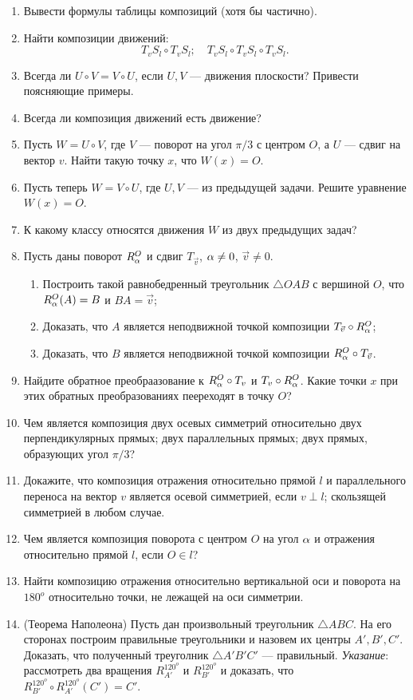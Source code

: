 \begin{enumerate}
\item Вывести формулы таблицы композиций (хотя бы частично).
\item Найти композиции движений:
$$
T_vS_l\circ T_vS_l;\quad T_vS_l\circ T_vS_l\circ T_vS_l.
$$
\item Всегда ли $U\circ V=V\circ U$, если $U,V$ --- движения плоскости? Привести поясняющие примеры.
\item Всегда ли композиция движений есть движение?
\item Пусть $W=U\circ V$, где $V$ --- поворот на угол $\pi/3$ с центром $O$, а $U$ --- сдвиг на вектор $v$. Найти такую точку $x$, что $W(x)=O$.
\item Пусть теперь $W=V\circ U$, где $U,V$ --- из предыдущей задачи. Решите уравнение $W(x)=O$.
\item К какому классу относятся движения $W$ из двух предыдущих задач?
\item Пусть даны поворот $R_\alpha^O$ и сдвиг $T_{\vec v}$, $\alpha\ne 0$, $\vec v\ne 0$.
\begin{enumerate}
\item Построить такой равнобедренный треугольник $\triangle OAB$ с вершиной $O$, что $R_\alpha^O(A)=B$ и $BA=\vec v$;
\item Доказать, что $A$ является неподвижной точкой композиции $T_{\vec v}\circ R_\alpha^O$;
\item Доказать, что $B$ является неподвижной точкой композиции $R_\alpha^O\circ T_{\vec v}$.
\end{enumerate}
\item Найдите обратное преобраазование к $R_\alpha^O\circ T_v$ и $T_v\circ R_\alpha^O$. Какие точки $x$ при этих обратных преобразованиях пеереходят в точку $O$?
\item Чем является композиция двух осевых симметрий относительно \ipunkt двух перпендикулярных прямых; \ipunkt двух параллельных прямых; \ipunkt двух прямых, образующих угол $\pi/3$?
\item Докажите, что композиция отражения относительно прямой $l$ и параллельного переноса на вектор $v$ является
\ipunkt осевой симметрией, если $v\perp l$; \ipunkt скользящей симметрией в любом случае.
\item Чем является композиция поворота с центром $O$ на угол $\alpha$ и отражения относительно прямой $l$, если $O\in l$?
\item Найти композицию отражения относительно вертикальной оси и поворота на $180^o$ относительно точки, не лежащей на оси симметрии.
\item (Теорема Наполеона) Пусть дан произвольный треугольник $\triangle ABC$. На его сторонах построим правильные треугольники и назовем их центры $A',B',C'$. Доказать, что полученный треуголник $\triangle A'B'C'$ --- правильный. \textit{Указание}: рассмотреть два вращения $R_{A'}^{120^o}$ и $R_{B'}^{120^o}$ и доказать, что $R_{B'}^{120^o}\circ R_{A'}^{120^o}(C')=C'$.

\end{enumerate}






